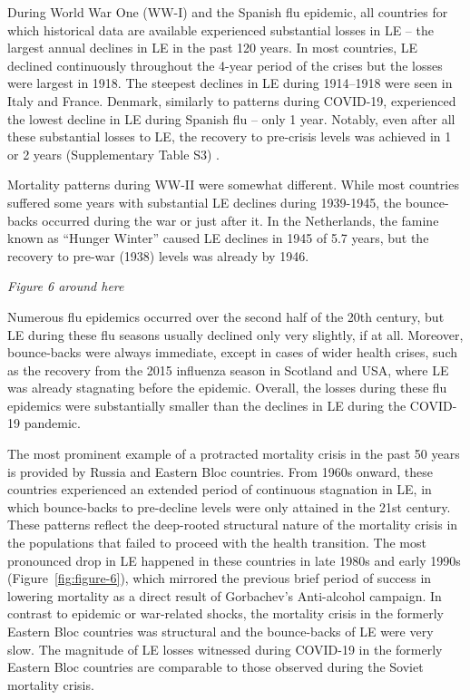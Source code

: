 \documentclass[12pt]{article}
\begin{document}
During World War One (WW-I) and the Spanish flu epidemic, all countries for which historical data are available experienced substantial losses in LE -- the largest annual declines in LE in the past 120 years. In most countries, LE declined continuously throughout the 4-year period of the crises but the losses were largest in 1918. The steepest declines in LE during 1914--1918 were seen in Italy and France. Denmark, similarly to patterns during COVID-19, experienced the lowest decline in LE during Spanish flu -- only 1 year. Notably, even after all these substantial losses to LE, the recovery to pre-crisis levels was achieved in 1 or 2 years (Supplementary Table S3) .

Mortality patterns during WW-II were somewhat different. While most countries suffered some years with substantial LE declines during 1939-1945, the bounce-backs occurred during the war or just after it. In the Netherlands, the famine known as ``Hunger Winter'' caused LE declines in 1945 of 5.7 years, but the recovery to pre-war (1938) levels was already  by 1946.\cite{Lumey1994}

\par\medskip
\emph{Figure 6 around here}
\par\medskip

Numerous flu epidemics occurred over the second half of the 20th century, but  LE during these flu seasons usually declined only very slightly, if at all. Moreover, bounce-backs were always immediate, except in cases of wider health crises, such as the recovery from the 2015 influenza season in Scotland and USA, where LE was already stagnating before the epidemic\cite{Fenton2019}. Overall, the losses during these flu epidemics were substantially smaller than the declines in LE during the COVID-19 pandemic.

The most prominent example of a protracted mortality crisis in the past 50 years is provided by Russia and Eastern Bloc countries. From 1960s onward, these countries experienced an extended period of continuous stagnation in LE, in which bounce-backs to pre-decline levels were only attained in the 21st century.\cite{Shkolnikov2013} These patterns reflect the deep-rooted structural nature of the mortality crisis in the populations that failed to proceed with the health transition.\cite{Timonin2016} The most pronounced drop in LE happened in these countries in late 1980s and early 1990s (Figure~\ref{fig:figure-6}), which mirrored the previous brief period of success in lowering mortality\cite{Zakharov1999} as a direct result of Gorbachev's Anti-alcohol campaign.\cite{Leon2009} In contrast to epidemic or war-related shocks, the mortality crisis in the formerly Eastern Bloc countries was structural and the bounce-backs of LE were very slow. The magnitude of LE losses witnessed during COVID-19 in the formerly Eastern Bloc countries are comparable to those observed during the Soviet mortality crisis.
\end{document}
